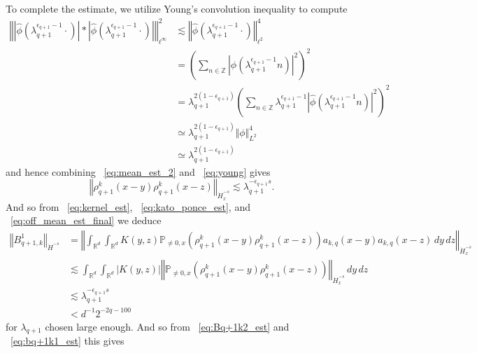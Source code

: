 \documentclass[12pt,reqno,letterpaper]{amsart}
\numberwithin{equation}{section}
\newcommand{\1}{{\bf 1}}
\newcommand{\2}{{\bf 2}}
\newcommand{\R}{\mathbb R}
\newcommand{\Z}{\mathbb Z}
\theoremstyle{remark}
\theoremstyle{remark}
\begin{document}
To complete the estimate, we utilize Young's convolution inequality to compute
\begin{equation}\label{eq:young}
    \begin{split}
        \left\Vert \left|\hat{\phi}\left(\lambda_{q+1}^{\epsilon_{q+1}-1}\cdot\right)\right| \ast \left|\hat{\phi}\left(\lambda_{q+1}^{\epsilon_{q+1}-1}\cdot\right)\right| \right\Vert_{\ell^\infty}^2 &\lesssim \left\Vert \hat{\phi}\left(\lambda_{q+1}^{\epsilon_{q+1}-1} \cdot\right)\right\Vert_{\ell^2}^4\\
        &= \left(\sum_{n \in \Z} \left|\hat{\phi}\left(\lambda_{q+1}^{\epsilon_{q+1}-1} n\right)\right|^2\right)^2\\
        &= \lambda_{q+1}^{2(1-\epsilon_{q+1})} \left(\sum_{n \in \Z} \lambda_{q+1}^{\epsilon_{q+1}-1} \left|\hat{\phi}\left(\lambda_{q+1}^{\epsilon_{q+1}-1} n\right)\right|^2\right)^2\\
        &\simeq \lambda_{q+1}^{2(1-\epsilon_{q+1})} \Vert \phi \Vert_{L^2}^4\\
        &\simeq \lambda_{q+1}^{2(1-\epsilon_{q+1})}
    \end{split}
\end{equation}
and hence combining ~\eqref{eq:mean_est_2} and ~\eqref{eq:young} gives
\begin{equation}\label{eq:off_mean_est_final}
    \left\Vert \rho_{q+1}^k(x-y) \rho_{q+1}^k(x-z)\right\Vert_{\dot{H}^{-s}_x} \lesssim \lambda_{q+1}^{-\epsilon_{q+1} s}.
\end{equation}
And so from ~\eqref{eq:kernel_est}, ~\eqref{eq:kato_ponce_est}, and ~\eqref{eq:off_mean_est_final} we deduce
\begin{equation}\label{eq:bq+1k1_est}
\begin{split}
    \left\Vert B_{q+1,k}^1\right\Vert_{\dot{H}^{-s}} &= \left\Vert \int_{\R^d} \int_{\R^d} K(y,z) \mathbb{P}_{\not=0,x}\left(\rho_{q+1}^k(x-y) \rho_{q+1}^k(x-z)\right) a_{k,q}(x-y)a_{k,q}(x-z)\, dy\, dz\right\Vert_{\dot{H}^{-s}_x}\\
    &\lesssim \int_{\R^d} \int_{\R^d} |K(y,z)| \left\Vert \mathbb{P}_{\not=0,x}\left(\rho_{q+1}^k(x-y) \rho_{q+1}^k(x-z)\right) \right\Vert_{\dot{H}_x^{-s}}\, dy\, dz\\
    &\lesssim \lambda_{q+1}^{-\epsilon_{q+1} s}\\
    &< d^{-1}2^{-2q-100}
    \end{split}
\end{equation}
for $\lambda_{q+1}$ chosen large enough. And so from ~\eqref{eq:Bq+1k2_est} and ~\eqref{eq:bq+1k1_est} this gives
\end{document}
